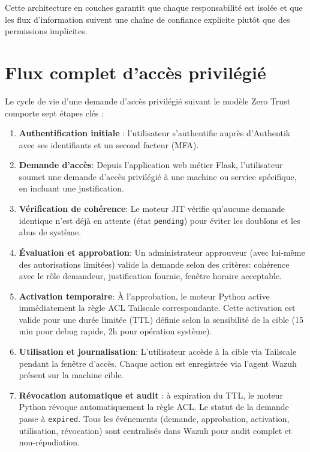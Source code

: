 Cette architecture en couches garantit que chaque responsabilité est isolée et que les flux d'information suivent une chaîne de confiance explicite plutôt que des permissions implicites.

\section{Flux complet d'accès privilégié}

Le cycle de vie d'une demande d'accès privilégié suivant le modèle Zero Trust comporte sept étapes clés :

\begin{enumerate}
	\item \textbf{Authentification initiale} : l'utilisateur s'authentifie auprès d'Authentik avec ses identifiants et un second facteur (MFA).
	
	\item \textbf{Demande d'accès}: Depuis l'application web métier Flask, l'utilisateur soumet une demande d'accès privilégié à une machine ou service spécifique, en incluant une justification.
	
	\item \textbf{Vérification de cohérence}: Le moteur JIT vérifie qu'aucune demande identique n'est déjà en attente (état \texttt{pending}) pour éviter les doublons et les abus de système.
	
	\item \textbf{Évaluation et approbation}: Un administrateur approuveur (avec lui-même des autorisations limitées) valide la demande selon des critères: cohérence avec le rôle demandeur, justification fournie, fenêtre horaire acceptable.
	
	\item \textbf{Activation temporaire}: À l'approbation, le moteur Python active immédiatement la règle ACL Tailscale correspondante. Cette activation est valide pour une durée limitée (TTL) définie selon la sensibilité de la cible (15 min pour debug rapide, 2h pour opération système).
	
	\item \textbf{Utilisation et journalisation}: L'utilisateur accède à la cible via Tailscale pendant la fenêtre d'accès. Chaque action est enregistrée via l'agent Wazuh présent sur la machine cible.
	
	\item \textbf{Révocation automatique et audit} : à expiration du TTL, le moteur Python révoque automatiquement la règle ACL. Le statut de la demande passe à \texttt{expired}. Tous les événements (demande, approbation, activation, utilisation, révocation) sont centralisés dans Wazuh pour audit complet et non-répudiation.
\end{enumerate}

